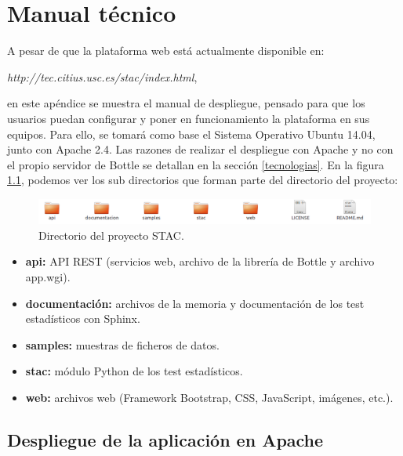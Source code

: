 \chapter{Manual técnico}
\noindent
A pesar de que la plataforma web está actualmente disponible en:

\begin{center}
\textit{http://tec.citius.usc.es/stac/index.html},
\end{center}

\noindent
en este apéndice se muestra el manual de despliegue, pensado para que los usuarios puedan configurar y poner en funcionamiento la plataforma en sus equipos. Para ello, se tomará como base el Sistema Operativo Ubuntu 14.04, junto con Apache 2.4. Las razones de realizar el despliegue con Apache y no con el propio servidor de Bottle se detallan en la sección \ref{tecnologias}. En la figura \ref{fig:directorio_proy}, podemos ver los sub directorios que forman parte del directorio del proyecto:

\begin{figure}[H]
\centering
\includegraphics[scale=0.5]{figuras/directorio_proy.png}
\caption{Directorio del proyecto STAC.}
\label{fig:directorio_proy}
\end{figure}

\begin{itemize}
\item \textbf{api:} API REST (servicios web, archivo de la librería de Bottle y archivo app.wgi).
\item \textbf{documentación:} archivos de la memoria y documentación de los test estadísticos con Sphinx.
\item \textbf{samples:} muestras de ficheros de datos.
\item \textbf{stac:} módulo Python de los test estadísticos.
\item \textbf{web:} archivos web (Framework Bootstrap, CSS, JavaScript, imágenes, etc.).
\end{itemize}

\section{Despliegue de la aplicación en Apache}

